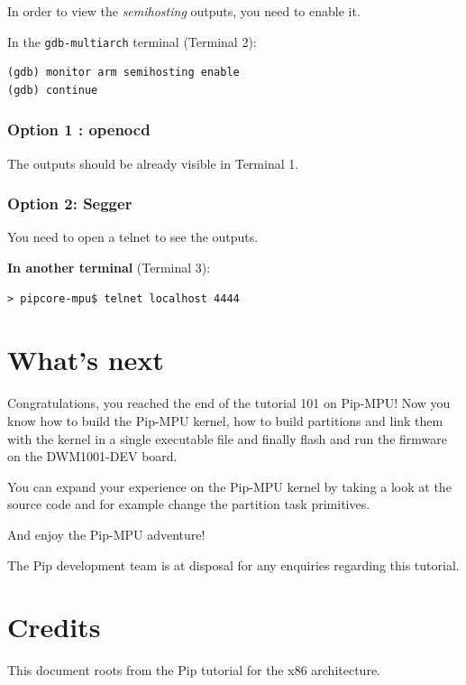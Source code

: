 \documentclass[10pt,a4paper,titlepage]{refart}
\begin{document}
In order to view the \textit{semihosting} outputs, you need to enable it.

In the \texttt{gdb-multiarch} terminal (Terminal 2):
\begin{lstlisting}[style=BashStyle]
(gdb) monitor arm semihosting enable
(gdb) continue
\end{lstlisting}

\subsubsection{Option 1 : openocd}
The outputs should be already visible in Terminal 1.

\subsubsection{Option 2: Segger}
You need to open a telnet to see the outputs.

\textbf{In another terminal} (Terminal 3):
\begin{lstlisting}[style=BashStyle]
> pipcore-mpu$ telnet localhost 4444
\end{lstlisting}

\section{What's next}
Congratulations, you reached the end of the tutorial 101 on Pip-MPU!
Now you know how to build the Pip-MPU kernel, how to build partitions and link them with the kernel in a single executable file and finally flash and run the firmware on the DWM1001-DEV board.

You can expand your experience on the Pip-MPU kernel by taking a look at the source code and for example change the partition task primitives.

And enjoy the Pip-MPU adventure!



The Pip development team is at disposal for any enquiries regarding this tutorial.


\section{Credits}
This document roots from the Pip tutorial for the x86 architecture.
\end{document}
